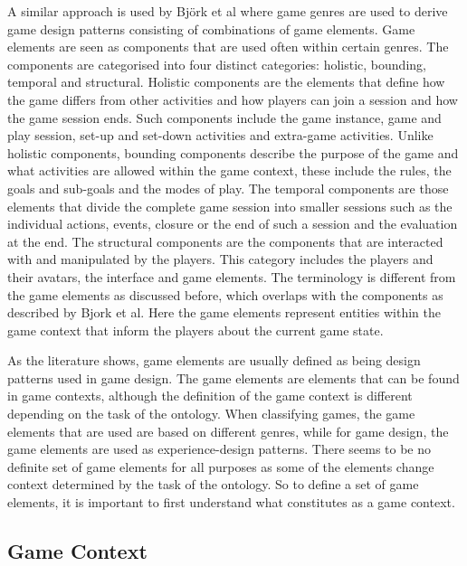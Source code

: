 \documentclass[11pt]{article}
\begin{document}
A similar approach is used by Bj\"ork et al \cite{Bjork2003, Bjork2003b} where game genres are used to derive game design patterns consisting of combinations of game elements. Game elements are seen as components that are used often within certain genres. The components are categorised into four distinct categories: holistic, bounding, temporal and structural. Holistic components are the elements that define how the game differs from other activities and how players can join a session and how the game session ends. Such components include the game instance, game and play session, set-up and set-down activities and extra-game activities. Unlike holistic components, bounding components describe the purpose of the game and what activities are allowed within the game context, these include the rules, the goals and sub-goals and the modes of play. The temporal components are those elements that divide the complete game session into smaller sessions such as the individual actions, events, closure or the end of 
such a session and the evaluation at the end. The structural components are the components that are interacted with and manipulated by the players. This category includes the players and their avatars, the interface and game elements. The terminology is different from the game elements as discussed before, which overlaps with the components as described by Bjork et al. Here the game elements represent entities within the game context that inform the players about the current game state.


As the literature shows, game elements are usually defined as being design patterns used in game design. The game elements are elements that can be found in game contexts, although the definition of the game context is different depending on the task of the ontology. When classifying games, the game elements that are used are based on different genres, while for game design, the game elements are used as experience-design patterns. There seems to be no definite set of game elements for all purposes as some of the elements change context determined by the task of the ontology. So to define a set of game elements, it is important to first understand what constitutes as a game context. 

\subsection{Game Context}
\end{document}

